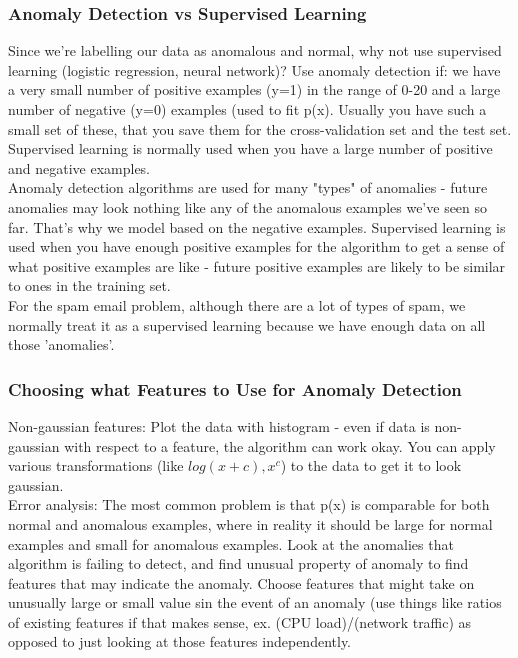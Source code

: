 \documentclass[11pt,letterpaper]{article}
\begin{document}
\subsubsection{Anomaly Detection vs Supervised Learning}
Since we're labelling our data as anomalous and normal, why not use supervised learning (logistic regression, neural network)?
Use anomaly detection if: we have a very small number of positive examples (y=1) in the range of 0-20 and a large number of negative (y=0) examples (used to fit p(x). Usually you have such a small set of these, that you save them for the cross-validation set and the test set. Supervised learning is normally used when you have a large number of positive and negative examples.\\
Anomaly detection algorithms are used for many "types" of anomalies - future anomalies may look nothing like any of the anomalous examples we've seen so far. That's why we model based on the negative examples.  Supervised learning is used when you have enough positive examples for the algorithm to get a sense of what positive examples are like - future positive examples are likely to be similar to ones in the training set.\\
For the spam email problem, although there are a lot of types of spam, we normally treat it as a supervised learning because we have enough data on all those 'anomalies'. 

\subsubsection{Choosing what Features to Use for Anomaly Detection}
Non-gaussian features: Plot the data with histogram - even if data is non-gaussian with respect to a feature, the algorithm can work okay. You can apply various transformations (like $log(x + c), x^c$) to the data to get it to look gaussian.\\
Error analysis: The most common problem is that p(x) is comparable for both normal and anomalous examples, where in reality it should be large for normal examples and small for anomalous examples. Look at the anomalies that algorithm is failing to detect, and find unusual property of anomaly to find features that may indicate the anomaly. Choose features that might take on unusually large or small value sin the event of an anomaly (use things like ratios of existing features if that makes sense, ex. (CPU load)/(network traffic) as opposed to just looking at those features independently. 
\end{document}
